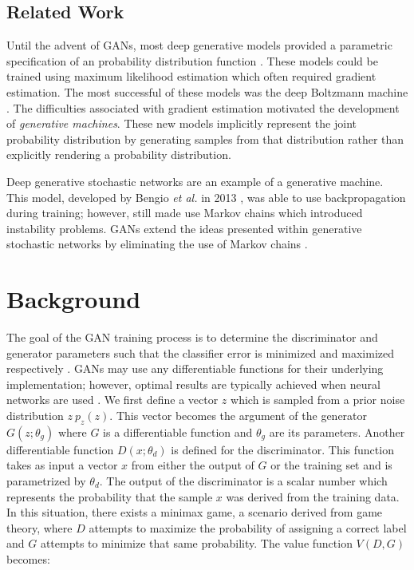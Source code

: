 \documentclass[11pt]{article}
\begin{document}
\subsection{Related Work}
Until the advent of GANs, most deep generative models provided a parametric specification of an probability distribution function \citep{2014arXiv1406.2661G}. These models could be trained using maximum likelihood estimation which often required gradient estimation. The most successful of these models was the deep Boltzmann machine \citep{2014arXiv1406.2661G}. The difficulties associated with gradient estimation motivated the development of \textit{generative machines}. These new models implicitly represent the joint probability distribution by generating samples from that distribution rather than explicitly rendering a probability distribution.

Deep generative stochastic networks are an example of a generative machine. This model, developed by Bengio \textit{et al.} in 2013 \citep{2013arXiv1306.1091B}, was able to use backpropagation during training; however, still made use Markov chains which introduced instability problems. GANs extend the ideas presented within generative stochastic networks by eliminating the use of Markov chains \citep{2014arXiv1406.2661G}.



\section{Background} \label{sec:background}
The goal of the GAN training process is to determine the discriminator and generator parameters such that the classifier error is minimized and maximized respectively \citep{2017arXiv171007035C}. GANs may use any differentiable functions for their underlying implementation; however, optimal results are typically achieved when neural networks are used \citep{2014arXiv1406.2661G}. We first define a vector $z$ which is sampled from a prior noise distribution $z~p_z(z)$. This vector becomes the argument of the generator $G(z;\theta_g)$ where $G$ is a differentiable function and $\theta_g$ are its parameters. Another differentiable function $D(x;\theta_d)$ is defined for the discriminator. This function takes as input a vector $x$ from either the output of $G$ or the training set and is parametrized by $\theta_d$. The output of the discriminator is a scalar number which represents the probability that the sample $x$ was derived from the training data. In this situation, there exists a minimax game, a scenario derived from game theory, where $D$ attempts to maximize the probability of assigning a correct label and $G$ attempts to minimize that same probability. The value function $V(D,G)$ becomes:
\end{document}
